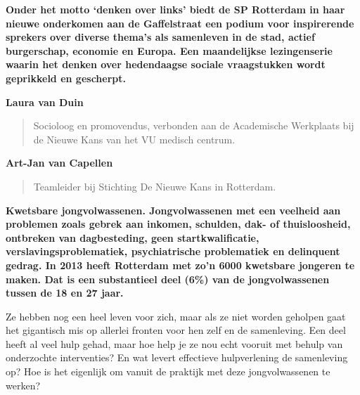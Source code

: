 \documentclass{article}
\begin{document}


\vfill

\textbf{Onder het motto `denken over links' biedt de SP Rotterdam in haar
nieuwe onderkomen aan de Gaffelstraat een podium voor inspirerende sprekers
over diverse thema's als samenleven in de stad, actief burgerschap, economie en
Europa. Een maandelijkse lezingenserie waarin het denken over hedendaagse
sociale vraagstukken wordt geprikkeld en gescherpt.}

\vfill


\vfill

\textbf{\large Laura van Duin}
\begin{quote}
  Socioloog en promovendus, verbonden aan de
  Academische Werkplaats bij de Nieuwe Kans van het VU
  medisch centrum.
\end{quote}

\vfill

\textbf{\large Art-Jan van Capellen}
\begin{quote}
  Teamleider bij Stichting De Nieuwe Kans in Rotterdam.
\end{quote}

\vfill


\newpage


\vfill

\textbf{Kwetsbare jongvolwassenen. Jongvolwassenen met een veelheid aan problemen zoals
gebrek aan inkomen, schulden, dak- of thuisloosheid, ontbreken van
dagbesteding, geen startkwalificatie, verslavingsproblematiek, psychiatrische
problematiek en delinquent gedrag. In 2013 heeft Rotterdam met zo'n 6000
kwetsbare jongeren te maken. Dat is een substantieel deel (6\%) van de
jongvolwassenen tussen de 18 en 27 jaar.}

\vfill

Ze hebben nog een heel leven voor zich, maar als ze niet worden geholpen gaat
het gigantisch mis op allerlei fronten voor hen zelf en de samenleving. Een
deel heeft al veel hulp gehad, maar hoe help je ze nou echt vooruit met behulp
van onderzochte interventies? En wat levert effectieve hulpverlening de
samenleving op? Hoe is het eigenlijk om vanuit de praktijk met deze
jongvolwassenen te werken?
\end{document}
